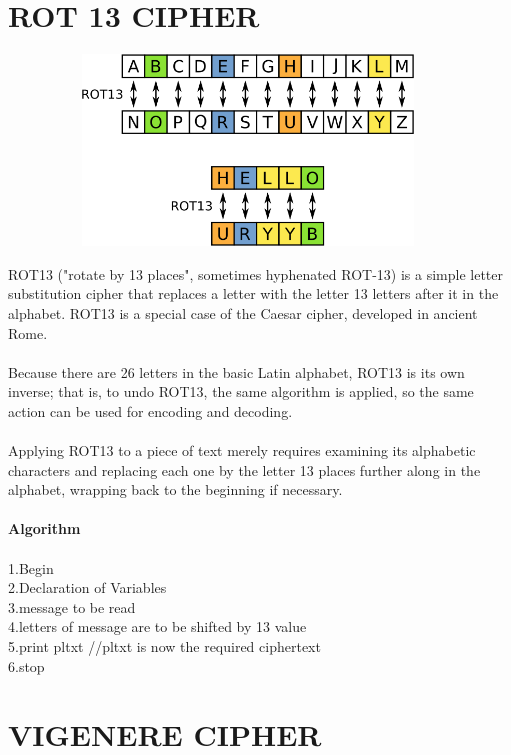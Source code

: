\documentclass[11pt]{article}
\begin{document}
\section{\textbf{ROT 13 CIPHER}}

\includegraphics[width=5in,height=2in]{ROT13.png}

ROT13 ("rotate by 13 places", sometimes hyphenated ROT-13) is a simple letter substitution cipher that replaces a letter with the letter 13 letters after it in the alphabet. ROT13 is a special case of the Caesar cipher, developed in ancient Rome.
\\
\\
Because there are 26 letters in the basic Latin alphabet, ROT13 is its own inverse; that is, to undo ROT13, the same algorithm is applied, so the same action can be used for encoding and decoding.
\\
\\
Applying ROT13 to a piece of text merely requires examining its alphabetic characters and replacing each one by the letter 13 places further along in the alphabet, wrapping back to the beginning if necessary.
\\
\\
\textbf{Algorithm}
\\
\\
1.Begin\\
2.Declaration of Variables\\
3.message to be read\\
4.letters of message are to be shifted by 13 value\\
5.print pltxt //pltxt is now the required ciphertext\\
6.stop







\section{\textbf{VIGENERE CIPHER}}
\end{document}
